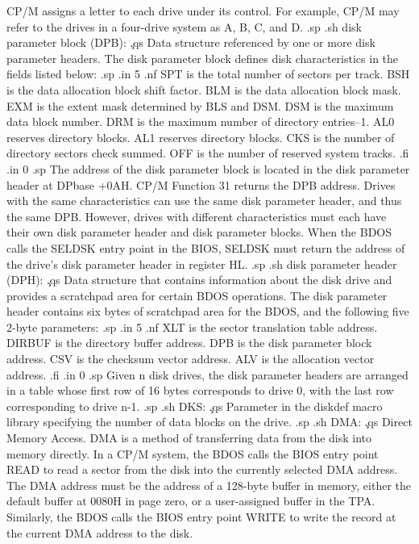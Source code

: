 CP/M assigns a letter to each drive under its 
control.  For example, CP/M may refer to the drives in a
four-drive system as A, B, C, and D.
.sp
.sh
disk parameter block (DPB):  \c
.qs
Data structure referenced by one or more disk parameter headers.  
The disk parameter block defines disk characteristics in the 
fields listed below:
.sp
.in 5
.nf
SPT is the total number of sectors per track.
BSH is the data allocation block shift factor.
BLM is the data allocation block mask.
EXM is the extent mask determined by BLS and DSM.
DSM is the maximum data block number.
DRM is the maximum number of directory entries--1.
AL0 reserves directory blocks.
AL1 reserves directory blocks.
CKS is the number of directory sectors check summed.
OFF is the number of reserved system tracks.
.fi
.in 0
.sp
The address of the disk parameter block is located in the disk 
parameter header at DPbase +0AH.  CP/M Function 31 returns the 
DPB address.  Drives with the same characteristics can use the 
same disk parameter header, and thus the same DPB.  However, 
drives with different characteristics must each have their own 
disk parameter header and disk parameter blocks.  When the BDOS 
calls the SELDSK entry point in the BIOS, SELDSK must return the 
address of the drive's disk parameter header in register HL.
.sp
.sh
disk parameter header (DPH):  \c
.qs
Data structure that contains information about the disk drive and 
provides a scratchpad area for certain BDOS operations.  The disk 
parameter header contains six bytes of scratchpad area for the 
BDOS, and the following five 2-byte parameters:
.sp
.in 5
.nf
XLT is the sector translation table address.
DIRBUF is the directory buffer address.
DPB is the disk parameter block address.
CSV is the checksum vector address.
ALV is the allocation vector address.
.fi
.in 0
.sp
Given n disk drives, the disk parameter headers are arranged in a 
table whose first row of 16 bytes corresponds to drive 0, with 
the last row corresponding to drive n-1.
.sp
.sh
DKS:  \c
.qs
Parameter in the diskdef macro library specifying the number of 
data blocks on the drive.
.sp
.sh
DMA:  \c
.qs
Direct Memory Access.  DMA is a method of transferring data from 
the disk into memory directly.  In a CP/M system, the BDOS calls 
the BIOS entry point READ to read a sector from the disk into the 
currently selected DMA address.  The DMA address must be the 
address of a 128-byte buffer in memory, either the default buffer 
at 0080H in page zero, or a user-assigned buffer in the TPA.  
Similarly, the BDOS calls the BIOS entry point WRITE to write the 
record at the current DMA address to the disk.

